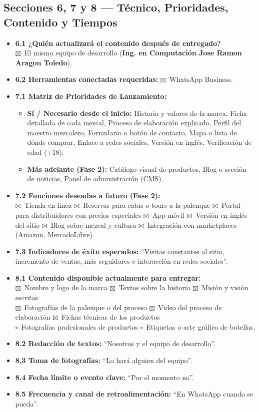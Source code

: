 \documentclass[11pt,letterpaper]{article}
\newcommand{\uchk}{$\square$}
\newcommand{\chk}{\textcolor{mezcalAgave}{$\boxtimes$}}
\begin{document}
\subsection{Secciones 6, 7 y 8 — Técnico, Prioridades, Contenido y Tiempos}
\begin{itemize}[leftmargin=1.5em]
    \item \textbf{6.1 ¿Quién actualizará el contenido después de entregado?}\\
    \chk\ El mismo equipo de desarrollo (\textbf{Ing. en Computación Jose Ramon Aragon Toledo}).
    \item \textbf{6.2 Herramientas conectadas requeridas:} \chk\ WhatsApp Business.
    \item \textbf{7.1 Matriz de Prioridades de Lanzamiento:}
    \begin{itemize}
        \item \textbf{Sí / Necesario desde el inicio:} Historia y valores de la marca, Ficha detallada de cada mezcal, Proceso de elaboración explicado, Perfil del maestro mezcalero, Formulario o botón de contacto, Mapa o lista de dónde comprar, Enlace a redes sociales, Versión en inglés, Verificación de edad (+18).
        \item \textbf{Más adelante (Fase 2):} Catálogo visual de productos, Blog o sección de noticias, Panel de administración (CMS).
    \end{itemize}
    \item \textbf{7.2 Funciones deseadas a futuro (Fase 2):}\\
    \chk\ Tienda en línea \quad
    \chk\ Reservas para catas o tours a la palenque \quad
    \chk\ Portal para distribuidores con precios especiales \quad
    \chk\ App móvil \quad
    \chk\ Versión en inglés del sitio \quad
    \chk\ Blog sobre mezcal y cultura \quad
    \chk\ Integración con marketplaces (Amazon, MercadoLibre).
    \item \textbf{7.3 Indicadores de éxito esperados:} ``Visitas constantes al sitio, incremento de ventas, más seguidores e interacción en redes sociales''.
    \item \textbf{8.1 Contenido disponible actualmente para entregar:}\\
    \chk\ Nombre y logo de la marca \quad
    \chk\ Textos sobre la historia \quad
    \chk\ Misión y visión escritas \\
    \chk\ Fotografías de la palenque o del proceso \quad
    \chk\ Video del proceso de elaboración \quad
    \chk\ Fichas técnicas de los productos \\
    \uchk\ Fotografías profesionales de productos \quad
    \uchk\ Etiquetas o arte gráfico de botellas.
    \item \textbf{8.2 Redacción de textos:} ``Nosotros y el equipo de desarrollo''.
    \item \textbf{8.3 Toma de fotografías:} ``Lo hará alguien del equipo''.
    \item \textbf{8.4 Fecha límite o evento clave:} ``Por el momento no''.
    \item \textbf{8.5 Frecuencia y canal de retroalimentación:} ``En WhatsApp cuando se pueda''.
\end{itemize}
\end{document}
